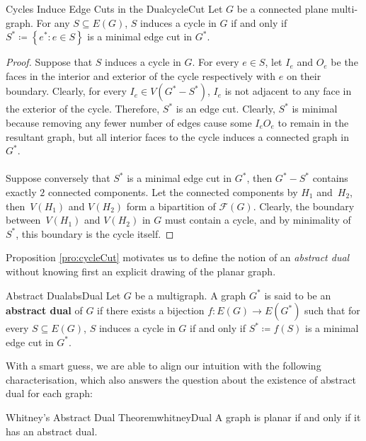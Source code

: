 \documentclass[math]{amznotes}
\theoremstyle{remark}
\newcommand{\0}{\mathbf{0}}
\newcommand{\1}{\mathbf{1}}
\begin{document}
\begin{probox}{Cycles Induce Edge Cuts in the Dual}{cycleCut}
    Let $G$ be a connected plane multi-graph. For any $S \subseteq E(G)$, $S$ induces a cycle in $G$ if and only if $S^* \coloneqq \left\{e^* \colon e \in S\right\}$ is a minimal edge cut in $G^*$.
    \tcblower
    \begin{proof}
        Suppose that $S$ induces a cycle in $G$. For every $e \in S$, let $I_e$ and $O_e$ be the faces in the interior and exterior of the cycle respectively with $e$ on their boundary. Clearly, for every $I_e \in V(G^* - S^*)$, $I_e$ is not adjacent to any face in the exterior of the cycle. Therefore, $S^*$ is an edge cut. Clearly, $S^*$ is minimal because removing any fewer number of edges cause some $I_eO_e$ to remain in the resultant graph, but all interior faces to the cycle induces a connected graph in $G^*$.
        \\\\
        Suppose conversely that $S^*$ is a minimal edge cut in $G^*$, then $G^* - S^*$ contains exactly $2$ connected components. Let the connected components by $H_1$ and~$H_2$, then~$V(H_1)$ and $V(H_2)$ form a bipartition of $\mathcal{F}(G)$. Clearly, the boundary between~$V(H_1)$ and $V(H_2)$ in $G$ must contain a cycle, and by minimality of $S^*$, this boundary is the cycle itself. 
    \end{proof}
\end{probox}
Proposition \ref{pro:cycleCut} motivates us to define the notion of an \textit{abstract dual} without knowing first an explicit drawing of the planar graph.
\begin{dfnbox}{Abstract Dual}{absDual}
    Let $G$ be a multigraph. A graph $G^*$ is said to be an {\color{red} \textbf{abstract dual}} of $G$ if there exists a bijection $f \colon E(G) \to E(G^*)$ such that for every $S \subseteq E(G)$, $S$ induces a cycle in $G$ if and only if $S^* \coloneqq f(S)$ is a minimal edge cut in $G^*$.
\end{dfnbox}
With a smart guess, we are able to align our intuition with the following characterisation, which also answers the question about the existence of abstract dual for each graph:
\begin{thmbox}{Whitney's Abstract Dual Theorem}{whitneyDual}
    A graph is planar if and only if it has an abstract dual.
\end{thmbox}
\end{document}
